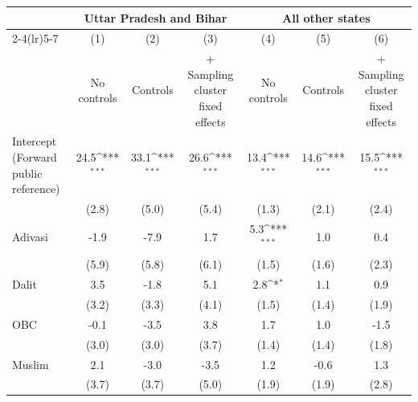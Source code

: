 {
\def\sym#1{\ifmmode^{#1}\else\(^{#1}\)\fi}
\begin{tabular}{l*{6}{c}}
\toprule
            &\multicolumn{3}{c}{Uttar Pradesh and Bihar}                      &\multicolumn{3}{c}{All other states}                             \\\cmidrule(lr){2-4}\cmidrule(lr){5-7}
            &\multicolumn{1}{c}{(1)}&\multicolumn{1}{c}{(2)}&\multicolumn{1}{c}{(3)}&\multicolumn{1}{c}{(4)}&\multicolumn{1}{c}{(5)}&\multicolumn{1}{c}{(6)}\\
            &\multicolumn{1}{c}{No controls}&\multicolumn{1}{c}{Controls}&\multicolumn{1}{c}{+ Sampling cluster fixed effects}&\multicolumn{1}{c}{No controls}&\multicolumn{1}{c}{Controls}&\multicolumn{1}{c}{+ Sampling cluster fixed effects}\\
\midrule
Intercept (Forward public reference)&        24.5\sym{***}&        33.1\sym{***}&        26.6\sym{***}&        13.4\sym{***}&        14.6\sym{***}&        15.5\sym{***}\\
            &       (2.8)         &       (5.0)         &       (5.4)         &       (1.3)         &       (2.1)         &       (2.4)         \\
\addlinespace
Adivasi     &        -1.9         &        -7.9         &         1.7         &         5.3\sym{***}&         1.0         &         0.4         \\
            &       (5.9)         &       (5.8)         &       (6.1)         &       (1.5)         &       (1.6)         &       (2.3)         \\
\addlinespace
Dalit       &         3.5         &        -1.8         &         5.1         &         2.8\sym{*}  &         1.1         &         0.9         \\
            &       (3.2)         &       (3.3)         &       (4.1)         &       (1.5)         &       (1.4)         &       (1.9)         \\
\addlinespace
OBC         &        -0.1         &        -3.5         &         3.8         &         1.7         &         1.0         &        -1.5         \\
            &       (3.0)         &       (3.0)         &       (3.7)         &       (1.4)         &       (1.4)         &       (1.8)         \\
\addlinespace
Muslim      &         2.1         &        -3.0         &        -3.5         &         1.2         &        -0.6         &         1.3         \\
            &       (3.7)         &       (3.7)         &       (5.0)         &       (1.9)         &       (1.9)         &       (2.8)         \\

\end{tabular}}
